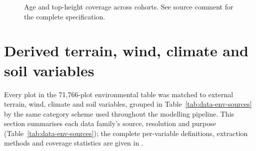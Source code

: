 \begin{figure}[!htbp]
\centering
{}
\caption{Age and top-height coverage across cohorts. See source comment for the complete
specification.}
\label{fig:data-target-age}
\end{figure}

\section{Derived terrain, wind, climate and soil variables}
\label{sec:data-environmental}

Every plot in the 71,766-plot environmental table was matched to external terrain, wind, climate
and soil variables, grouped in Table~\ref{tab:data-env-sources} by the same category scheme used
throughout the modelling pipeline. This section summarises each data family's source, resolution
and purpose (Table~\ref{tab:data-env-sources}); the complete per-variable definitions, extraction
methods and coverage statistics are given in .

